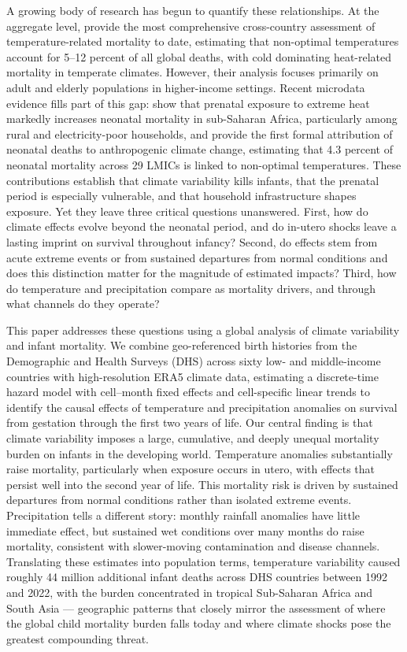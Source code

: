 \documentclass[a4paper]{article}
\begin{document}
A growing body of research has begun to quantify these relationships. At the aggregate level, \textcite{burke2025} provide the most comprehensive cross-country assessment of temperature-related mortality to date, estimating that non-optimal temperatures account for 5--12 percent of all global deaths, with cold dominating heat-related mortality in temperate climates. However, their analysis focuses primarily on adult and elderly populations in higher-income settings. Recent microdata evidence fills part of this gap: \textcite{wang2025} show that prenatal exposure to extreme heat markedly increases neonatal mortality in sub-Saharan Africa, particularly among rural and electricity-poor households, and \textcite{dimitrova2024} provide the first formal attribution of neonatal deaths to anthropogenic climate change, estimating that 4.3 percent of neonatal mortality across 29 LMICs is linked to non-optimal temperatures. These contributions establish that climate variability kills infants, that the prenatal period is especially vulnerable, and that household infrastructure shapes exposure. Yet they leave three critical questions unanswered. First, how do climate effects evolve beyond the neonatal period, and do in-utero shocks leave a lasting imprint on survival throughout infancy? Second, do effects stem from acute extreme events or from sustained departures from normal conditions and does this distinction matter for the magnitude of estimated impacts? Third, how do temperature and precipitation compare as mortality drivers, and through what channels do they operate?

This paper addresses these questions using a global analysis of climate variability and infant mortality. We combine geo-referenced birth histories from the Demographic and Health Surveys (DHS) across sixty low- and middle-income countries with high-resolution ERA5 climate data, estimating a discrete-time hazard model with cell--month fixed effects and cell-specific linear trends to identify the causal effects of temperature and precipitation anomalies on survival from gestation through the first two years of life. Our central finding is that climate variability imposes a large, cumulative, and deeply unequal mortality burden on infants in the developing world. Temperature anomalies substantially raise mortality, particularly when exposure occurs in utero, with effects that persist well into the second year of life. This 
mortality risk is driven by sustained departures from normal conditions rather than isolated extreme events. Precipitation tells a different story: monthly rainfall anomalies have little immediate effect, but sustained wet conditions over many months do raise mortality, consistent with slower-moving contamination and disease channels. Translating these estimates into population terms, temperature variability caused roughly 44 million additional infant deaths across DHS countries between 1992 and 2022, with the burden concentrated in tropical Sub-Saharan Africa and South Asia — geographic patterns that closely mirror the \parencite{UNIGME2025} assessment of where the global child mortality burden falls today and where climate shocks pose the greatest compounding threat.
\end{document}
